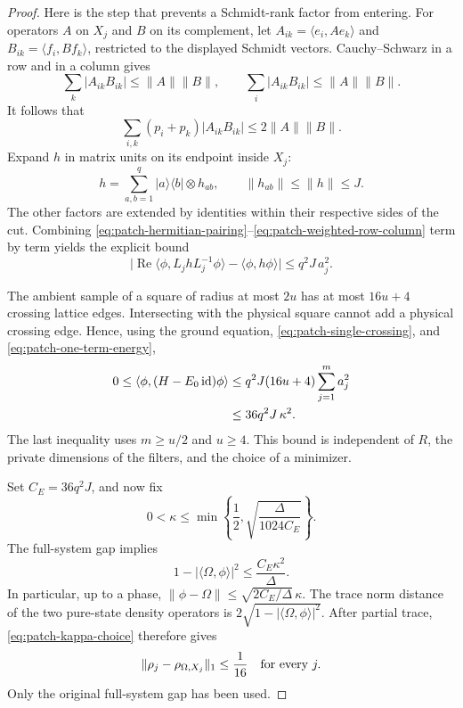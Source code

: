 \documentclass[11pt]{article}
\numberwithin{equation}{section}
\theoremstyle{definition}
\theoremstyle{remark}
\begin{document}
\begin{proof}
Here is the step that prevents a Schmidt-rank factor from entering.
For operators \(A\) on \(X_j\) and \(B\) on its complement,
let \(A_{ik}=\langle e_i,Ae_k\rangle\) and
\(B_{ik}=\langle f_i,Bf_k\rangle\), restricted to the displayed
Schmidt vectors.  Cauchy--Schwarz in a row and in a column gives
\[
 \sum_k\lvert A_{ik}B_{ik}\rvert\leq\lVert A\rVert\lVert B\rVert,
 \qquad
 \sum_i\lvert A_{ik}B_{ik}\rvert\leq\lVert A\rVert\lVert B\rVert.
\]
It follows that
\begin{equation}
 \sum_{i,k}(p_i+p_k)\lvert A_{ik}B_{ik}\rvert
       \leq2\lVert A\rVert\lVert B\rVert.
 \label{eq:patch-weighted-row-column}
\end{equation}
Expand \(h\) in matrix units on its endpoint inside \(X_j\):
\[
 h=\sum_{a,b=1}^q
       \lvert a\rangle\langle b\rvert\otimes h_{ab},
 \qquad \lVert h_{ab}\rVert\leq\lVert h\rVert\leq J.
\]
The other factors are extended by identities within their respective
sides of the cut.  Combining
\eqref{eq:patch-hermitian-pairing}--\eqref{eq:patch-weighted-row-column}
term by term yields the explicit bound
\begin{equation}
 \lvert \operatorname{Re}\langle\phi,L_j h L_j^{-1}\phi\rangle
                  -\langle\phi,h\phi\rangle\rvert
       \leq q^2J\,a_j^2.
 \label{eq:patch-one-term-energy}
\end{equation}

The ambient sample of a square of radius at most \(2u\) has at most
\(16u+4\) crossing lattice edges.  Intersecting with the physical
square cannot add a physical crossing edge.  Hence, using the
ground equation, \eqref{eq:patch-single-crossing}, and
\eqref{eq:patch-one-term-energy},
\begin{align}
 0\leq\langle\phi,(H-E_0\operatorname{id})\phi\rangle
 &\leq q^2J(16u+4)\sum_{j=1}^m a_j^2 \notag\\
 &\leq 36q^2J\,\kappa^2.
 \label{eq:patch-energy-bound}
\end{align}
The last inequality uses \(m\geq u/2\) and \(u\geq4\).
This bound is independent of \(R\), the private dimensions of the
filters, and the choice of a minimizer.

Set \(C_E=36q^2J\), and now fix
\begin{equation}
 0<\kappa\leq
 \min\left\{\frac12,\sqrt{\frac{\Delta}{1024C_E}}\right\}.
 \label{eq:patch-kappa-choice}
\end{equation}
The full-system gap implies
\[
 1-\lvert \langle\Omega,\phi\rangle\rvert^2
       \leq \frac{C_E\kappa^2}{\Delta}.
\]
In particular, up to a phase,
\(\lVert \phi-\Omega\rVert\leq
\sqrt{2C_E/\Delta}\,\kappa\).
The trace norm distance of the two pure-state density operators is
\(2\sqrt{1-\lvert \langle\Omega,\phi\rangle\rvert^2}\).
After partial trace, \eqref{eq:patch-kappa-choice} therefore gives
\begin{equation}
 \lVert \rho_j-\rho_{\Omega,X_j}\rVert_1\leq\frac1{16}
 \quad\hbox{for every }j.
 \label{eq:patch-marginal-closeness}
\end{equation}
Only the original full-system gap has been used.


\end{proof}
\end{document}
